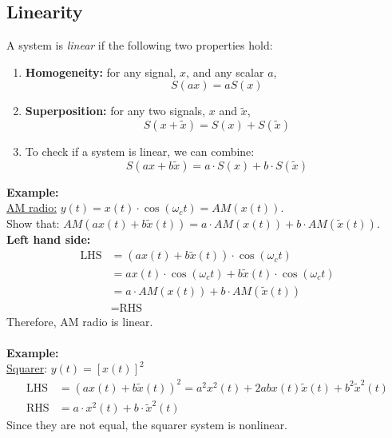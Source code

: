 \documentclass[10pt]{article}
\newcommand{\example}{\textbf{Example: }}
\begin{document}
\subsection*{Linearity}
A system is \textit{linear} if the following two properties hold:
\begin{enumerate}
    \item \textbf{Homogeneity:} for any signal, $x$, and any scalar $a$,
    \[S(ax) = aS(x)\]
    \item \textbf{Superposition:} for any two signals, $x$ and $\widetilde{x}$,
    \[S(x + \widetilde{x}) = S(x) + S(\widetilde{x})\]
    \item To check if a system is linear, we can combine:
    \[S(ax + b\widetilde{x}) = a \cdot S(x) + b \cdot S(\widetilde{x})\]
\end{enumerate}
\example\\
\underline{AM radio:} $y(t) = x(t) \cdot \cos(\omega_c t) = AM(x(t))$.\\
Show that: $AM(ax(t) + b\widetilde{x}(t)) = a \cdot AM(x(t)) + b \cdot AM(\widetilde{x}(t))$.\\
\textbf{Left hand side:}
\begin{align*}
    \text{LHS} &= (ax(t) + b\widetilde{x}(t)) \cdot \cos(\omega_c t) \\
    &= ax(t) \cdot \cos(\omega_c t) + b\widetilde{x}(t) \cdot \cos(\omega_c t) \\
    &= a \cdot AM(x(t)) + b \cdot AM(\widetilde{x}(t))\\
    &= \text{RHS}
\end{align*}
Therefore, AM radio is linear.\\\\
\example\\
\underline{Squarer}: $y(t) = [x(t)]^2$
\begin{align*}
\text{LHS} &= (ax(t) + b\widetilde{x}(t))^2 = a^2x^2(t) + 2abx(t)\widetilde{x}(t) + b^2\widetilde{x}^2(t)\\
\text{RHS} &= a \cdot x^2(t) + b \cdot \widetilde{x}^2(t)
\end{align*}
Since they are not equal, the squarer system is nonlinear.
\end{document}

